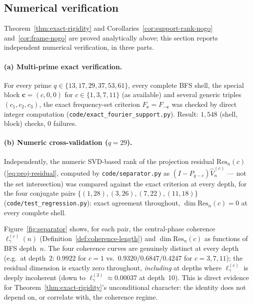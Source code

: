 \documentclass[11pt,a4paper]{article}
\begin{document}
  \subsection{Numerical verification}
    \label{subsec:numerical-verification}

    Theorem~\ref{thm:exact-rigidity} and Corollaries~\ref{cor:support-rank-nogo}
    and~\ref{cor:frame-nogo} are proved analytically above; this section reports independent
    numerical verification, in three parts.

    \begin{sloppypar}
    \paragraph{(a) Multi-prime exact verification.}
      For every prime $q \in \{13,17,29,37,53,61\}$, every complete BFS shell, the special block
      $\mathbf{c}=(c,0,0)$ for $c \in \{1,3,7,11\}$ (as available) and several generic triples
      $(c_1,c_2,c_3)$, the exact frequency-set criterion $F_{\mathbf c} = F_{-\mathbf c}$ was checked
      by direct integer computation (\texttt{code/\allowbreak exact\_fourier\_support.py}). Result: $1{,}548$
      (shell, block) checks, $0$ failures.
    \end{sloppypar}

    \paragraph{(b) Numeric cross-validation ($q=29$).}
      Independently, the numeric SVD-based rank of the projection residual $\mathrm{Res}_n(c)$
      (\eqref{eq:proj-residual}, computed by \texttt{code/separator.py} as
      $(I-P_{q-c})\widehat V_n^{(c)}$ --- not the set intersection) was compared against the exact
      criterion at every depth, for the four conjugate pairs $\{(1,28),(3,26),(7,22),(11,18)\}$
      (\texttt{code/\allowbreak test\_regression.py}): exact agreement throughout, $\dim\mathrm{Res}_n(c) = 0$ at
      every complete shell.

      Figure~\ref{fig:separator} shows, for each pair, the central-phase coherence
      $\ell_\gamma^{(c)}(n)$ (Definition~\ref{def:coherence-length}) and $\dim\mathrm{Res}_n(c)$ as
      functions of BFS depth~$n$. The four coherence curves are genuinely distinct at every depth
      (e.g.\ at depth~2: $0.9922$ for $c=1$ vs.\ $0.9320/0.6847/0.4247$ for $c=3,7,11$); the residual
      dimension is exactly zero throughout, \emph{including} at depths where $\ell_\gamma^{(c)}$ is
      deeply incoherent (down to $\ell_\gamma^{(3)} \approx 0.00037$ at depth~10). This is direct
      evidence for Theorem~\ref{thm:exact-rigidity}'s unconditional character: the identity does not
      depend on, or correlate with, the coherence regime.
\end{document}
